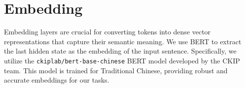 \documentclass[PhD]{PHlab-thesis}
\begin{document}

\section{Embedding}
Embedding layers are crucial for converting tokens into dense vector representations that capture their semantic meaning. We use BERT to extract the last hidden state as the embedding of the input sentence. Specifically, we utilize the \texttt{ckiplab/bert-base-chinese} BERT model developed by the CKIP team. This model is trained for Traditional Chinese, providing robust and accurate embeddings for our tasks.

\end{document}

